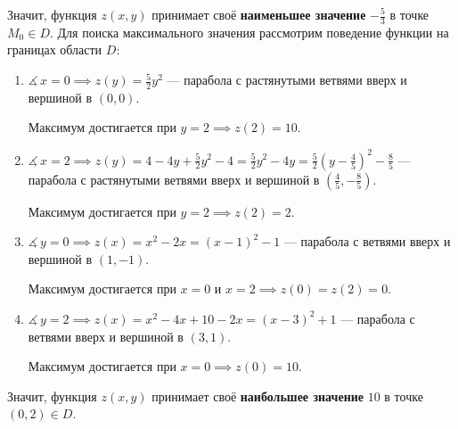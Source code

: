 \begin{solution}
  Значит, функция \( z(x,y) \) принимает своё \textbf{наименьшее значение} \( -\frac{5}{3} \) в точке \( M_0\in D \). Для поиска максимального значения рассмотрим поведение функции на границах области \( D \):
  \begin{enumerate}
    \item \( \measuredangle\, x=0\implies z(y)=\frac{5}{2}y^2 \) --- парабола с растянутыми ветвями вверх и вершиной в \( (0,0) \).
    
    Максимум достигается при \( y=2\implies z(2)=10 \).
    \item \( \measuredangle\, x=2\implies z(y)=4-4y+\frac{5}{2}y^2-4=\frac{5}{2}y^2-4y=\frac{5}{2}\left(y-\frac{4}{5}\right)^2-\frac{8}{5} \) --- парабола с растянутыми ветвями вверх и вершиной в \( (\frac{4}{5},-\frac{8}{5}) \).
    
    Максимум достигается при \( y=2\implies z(2)=2 \).
    \item \( \measuredangle\, y=0\implies z(x)=x^2-2x=(x-1)^2-1 \) --- парабола с ветвями вверх и вершиной в \( (1,-1) \).
    
    Максимум достигается при \( x=0 \) и \( x=2\implies z(0)=z(2)=0 \).
    \item \( \measuredangle\, y=2\implies z(x)=x^2-4x+10-2x=(x-3)^2+1 \) --- парабола с ветвями вверх и вершиной в \( (3,1) \).
    
    Максимум достигается при \( x=0\implies z(0)=10 \).
  \end{enumerate}
  
  Значит, функция \( z(x,y) \) принимает своё \textbf{наибольшее значение} \( 10 \) в точке \( (0,2)\in D \).
\end{solution}